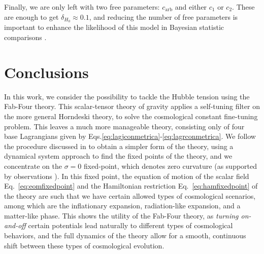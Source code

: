 \documentclass[onecolumn,superscriptaddress,secnumarabic,amssymb,amsmath,nobibnotes,aps,prd,nofootinbib,altaffilletter]{revtex4}
\begin{document}
Finally, we are only left with two free parameters: $c_{\text{arb}}$ and either $c_1$ or $c_2$. These are enough to get $\delta_{H_0}\approx0.1$, and reducing the number of free parameters is important to enhance the likelihood of this model in Bayesian statistic comparisons \cite{escamilla2023}.


\section{Conclusions} 
\label{sec:conclusions}
 
In this work, we consider the possibility to tackle the Hubble tension using the Fab-Four theory. This scalar-tensor theory of gravity applies a self-tuning filter on the more general Horndeski theory, to solve the cosmological constant fine-tuning problem. This leaves a much more manageable theory, consisting only of four base Lagrangians given by Eqs.\eqref{eq:lagjconmetrica}-\eqref{eq:lagrconmetrica}. We follow the procedure discussed in \cite{Copeland:2012qf} to obtain a simpler form of the theory, using a dynamical system approach to find the fixed points of the theory, and we concentrate on the $\sigma=0$ fixed-point, which denotes zero curvature (as supported by observations \cite{Planck_2020}). In this fixed point, the equation of motion of the scalar field Eq.~\eqref{eq:eomfixedpoint} and the Hamiltonian restriction Eq.~\eqref{eq:hamfixedpoint} of the theory are such that we have certain allowed types of cosmological scenarios, among which are the inflationary expansion, radiation-like expansion, and a matter-like phase. This shows the utility of the Fab-Four theory, as \textit{turning on-and-off} certain potentials lead naturally to different types of cosmological behaviors, and the full dynamics of the theory allow for a smooth, continuous shift between these types of cosmological evolution.
\end{document}
